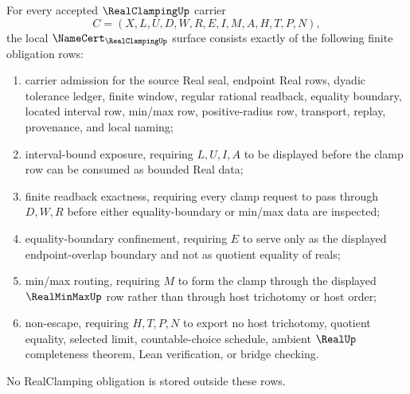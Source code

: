 \begin{theorem}
\label{thm:real-clamping-namecert-obligations}
For every accepted $\RealClampingUp$ carrier
$$
C=(X,L,U,D,W,R,E,I,M,A,H,T,P,N),
$$
the local $\NameCert_{\RealClampingUp}$ surface consists exactly of the following finite obligation rows:
\begin{enumerate}
\item carrier admission for the source Real seal, endpoint Real rows, dyadic tolerance ledger, finite window, regular rational readback, equality boundary, located interval row, min/max row, positive-radius row, transport, replay, provenance, and local naming;
\item interval-bound exposure, requiring $L,U,I,A$ to be displayed before the clamp row can be consumed as bounded Real data;
\item finite readback exactness, requiring every clamp request to pass through $D,W,R$ before either equality-boundary or min/max data are inspected;
\item equality-boundary confinement, requiring $E$ to serve only as the displayed endpoint-overlap boundary and not as quotient equality of reals;
\item min/max routing, requiring $M$ to form the clamp through the displayed $\RealMinMaxUp$ row rather than through host trichotomy or host order;
\item non-escape, requiring $H,T,P,N$ to export no host trichotomy, quotient equality, selected limit, countable-choice schedule, ambient $\RealUp$ completeness theorem, Lean verification, or bridge checking.
\end{enumerate}
No RealClamping obligation is stored outside these rows.
\end{theorem}
